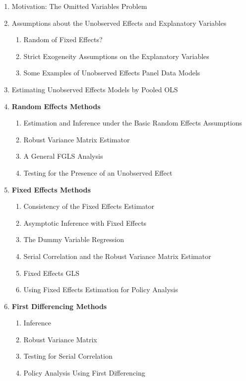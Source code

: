\documentclass[11pt, oneside, a4paper, article]{article}
\numberwithin{equation}{section}
\begin{document}
\begin{enumerate}[noitemsep, label*=10.\arabic*.]
\item  Motivation: The Omitted Variables Problem

\item  Assumptions about the Unobserved Effects and Explanatory Variables
\begin{enumerate}[noitemsep, leftmargin=1 em, label*=\arabic*.]
\item Random of Fixed Effects?
\item Strict Exogeneity Assumptions on the Explanatory Variables
\item Some Examples of Unobserved Effects Panel Data Models
\end{enumerate}

\item Estimating Unobserved Effects Models by Pooled OLS

\item \textbf{Random Effects Methods}
\begin{enumerate}[noitemsep, leftmargin=1 em, label*=\arabic*.]
\item Estimation and Inference under the Basic Random Effects Assumptions
\item Robust Variance Matrix Estimator
\item A General FGLS Analysis
\item Testing for the Presence of an Unobserved Effect
\end{enumerate}

\item \textbf{Fixed Effects Methods}
\begin{enumerate}[noitemsep, leftmargin=1 em, label*=\arabic*.]
\item Consistency of the Fixed Effects Estimator
\item Asymptotic Inference with Fixed Effects
\item The Dummy Variable Regression
\item Serial Correlation and the Robust Variance Matrix Estimator
\item Fixed Effects GLS
\item Using Fixed Effects Estimation for Policy Analysis
\end{enumerate}

\item \textbf{First Differencing Methods}
\begin{enumerate}[noitemsep, leftmargin=1 em, label*=\arabic*.]
\item Inference
\item Robust Variance Matrix
\item Testing for Serial Correlation
\item Policy Analysis Using First Differencing
\end{enumerate}


\end{enumerate}
\end{document}
